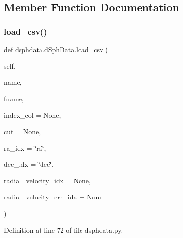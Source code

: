 \subsection{Member Function Documentation}
\mbox{\label{classdsphdata_1_1dSphData_a582365655d5493e34b14c2697e79c4fe}} 
\subsubsection{\texorpdfstring{load\+\_\+csv()}{load\_csv()}}
{\footnotesize\ttfamily def dsphdata.\+d\+Sph\+Data.\+load\+\_\+csv (\begin{DoxyParamCaption}\item[{}]{self,  }\item[{}]{name,  }\item[{}]{fname,  }\item[{}]{index\+\_\+col = {\ttfamily None},  }\item[{}]{cut = {\ttfamily None},  }\item[{}]{ra\+\_\+idx = {\ttfamily \char`\"{}ra\char`\"{}},  }\item[{}]{dec\+\_\+idx = {\ttfamily \char`\"{}dec\char`\"{}},  }\item[{}]{radial\+\_\+velocity\+\_\+idx = {\ttfamily None},  }\item[{}]{radial\+\_\+velocity\+\_\+err\+\_\+idx = {\ttfamily None} }\end{DoxyParamCaption})}



Definition at line 72 of file dsphdata.\+py.


